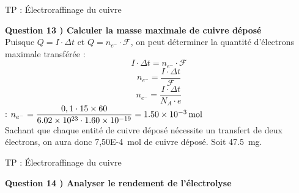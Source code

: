 \documentclass{beamer}
\begin{document}
\begin{frame}{TP : Électroraffinage du cuivre}
\begin{minipage}{\linewidth}
\textbf{Question 13 ) Calculer la masse maximale de cuivre déposé}\\
Puisque $Q = I \cdot \Delta t$ et $Q = n_{e^-} \cdot \mathcal{F}$, on peut déterminer la quantité d'électrons maximale transférée :
$$ I \cdot \Delta t =  n_{e^-} \cdot \mathcal{F}$$
$$ n_{e^-} = \dfrac{I \cdot \Delta t}{\mathcal{F}} $$
$$ n_{e^-} = \dfrac{I \cdot \Delta t}{N_A \cdot e} $$
 : $ n_{e^-} = \dfrac{0,1 \cdot 15 \times 60}{\num{6,02E23} \cdot \num{1,60E-19}} = \SI{1,50E-3}{\mole}$\\
Sachant que chaque entité de cuivre déposé nécessite un transfert de deux électrons, on aura donc \SI{7,50E-4}{\mole} de cuivre déposé. Soit \SI{47,5}{mg}.
\end{minipage}
\end{frame}

\begin{frame}{TP : Électroraffinage du cuivre}
\begin{minipage}{\linewidth}
\textbf{Question 14 ) Analyser le rendement de l'électrolyse}\\
\vspace{5cm}
\end{minipage}
\end{frame}
\end{document}

